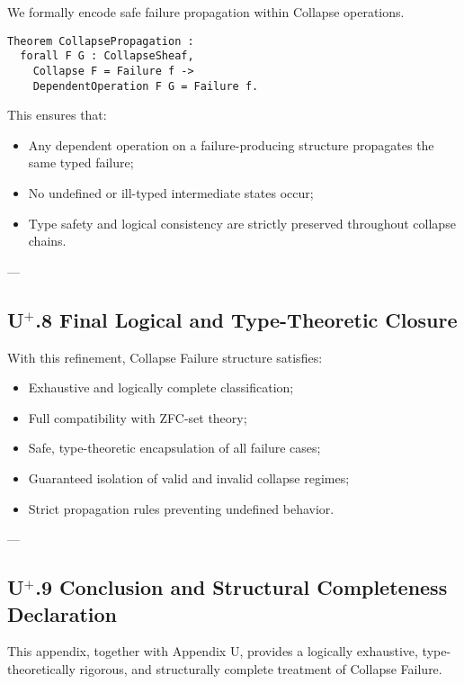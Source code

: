 \documentclass[11pt]{article}
\begin{document}
We formally encode safe failure propagation within Collapse operations.

\begin{lstlisting}[language=Coq]
Theorem CollapsePropagation :
  forall F G : CollapseSheaf,
    Collapse F = Failure f ->
    DependentOperation F G = Failure f.
\end{lstlisting}

This ensures that:

\begin{itemize}
    \item Any dependent operation on a failure-producing structure propagates the same typed failure;
    \item No undefined or ill-typed intermediate states occur;
    \item Type safety and logical consistency are strictly preserved throughout collapse chains.
\end{itemize}

---

\subsection*{U$^{+}$.8 Final Logical and Type-Theoretic Closure}

With this refinement, Collapse Failure structure satisfies:

\begin{itemize}
    \item Exhaustive and logically complete classification;
    \item Full compatibility with ZFC-set theory;
    \item Safe, type-theoretic encapsulation of all failure cases;
    \item Guaranteed isolation of valid and invalid collapse regimes;
    \item Strict propagation rules preventing undefined behavior.
\end{itemize}

---

\subsection*{U$^{+}$.9 Conclusion and Structural Completeness Declaration}

This appendix, together with Appendix U, provides a logically exhaustive, type-theoretically rigorous, and structurally complete treatment of Collapse Failure.
\end{document}
